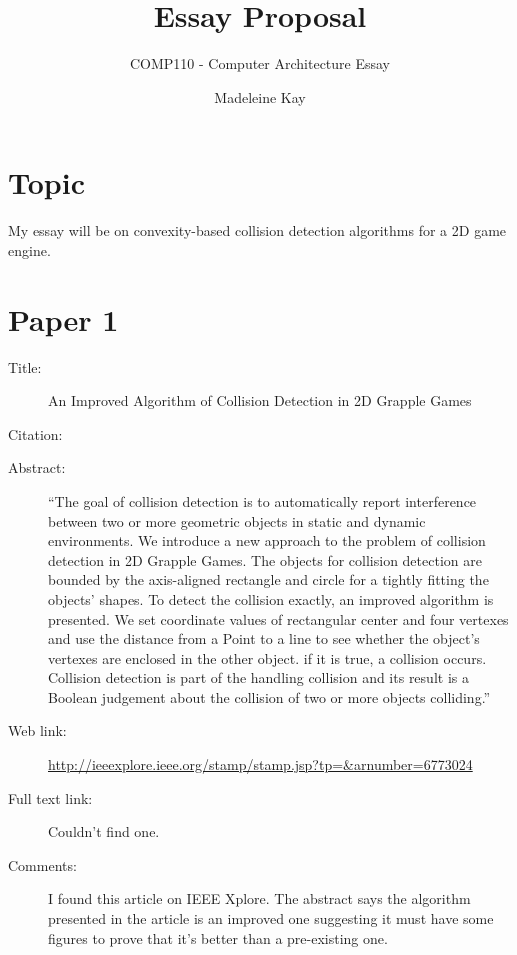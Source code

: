 \documentclass{scrartcl}
\title{Essay Proposal}
\subtitle{COMP110 - Computer Architecture Essay}
\author{Madeleine Kay}
\begin{document}
\maketitle

\section*{Topic}

My essay will be on convexity-based collision detection algorithms for a 2D game engine.

\section*{Paper 1}
\begin{description}
\item[Title:] An Improved Algorithm of Collision Detection in 2D Grapple Games
\item[Citation:] \cite{guo}
\item[Abstract:] ``The goal of collision detection is to automatically report interference between two or more geometric objects in static and dynamic environments. We introduce a new approach to the problem of collision detection in 2D Grapple Games. The objects for collision detection are bounded by the axis-aligned rectangle and circle for a tightly fitting the objects' shapes. To detect the collision exactly, an improved algorithm is presented. We set coordinate values of rectangular center and four vertexes and use the distance from a Point to a line to see whether the object's vertexes are enclosed in the other object. if it is true, a collision occurs. Collision detection is part of the handling collision and its result is a Boolean judgement about the collision of two or more objects colliding.''
\item[Web link:] \url{http://ieeexplore.ieee.org/stamp/stamp.jsp?tp=&arnumber=6773024}
\item[Full text link:] Couldn't find one.
\item[Comments:] I found this article on IEEE Xplore. The abstract says the algorithm presented in the article is an improved one suggesting it must have some figures to prove that it's better than a pre-existing one. 
\end{description}
\end{document}
